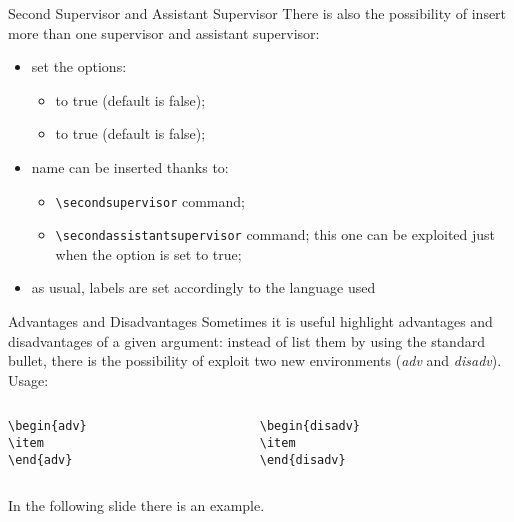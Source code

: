 \begin{frame}[t,fragile]{Second Supervisor and Assistant Supervisor}
There is also the possibility of insert more than one supervisor and assistant supervisor:
\begin{itemize}
\item set the options:
\begin{itemize}
\item {} to true (default is false);
\item {} to true (default is false);
\end{itemize}
\item name can be inserted thanks to:
\begin{itemize}
\item \verb!\secondsupervisor! command;
\item \verb!\secondassistantsupervisor! command; this one can be exploited just when the  option is set to true;
\end{itemize}
\item as usual, labels are set accordingly to the language used
\end{itemize}
\end{frame}

\begin{frame}[t,fragile]{Advantages and Disadvantages}
Sometimes it is useful highlight advantages and disadvantages of a given argument: instead of list them by using the standard bullet, there is the possibility of exploit two new environments (\emph{adv} and \emph{disadv}). Usage:
\begin{columns}
\begin{column}{0.3\paperwidth}
\begin{verbatim}
\begin{adv}
\item 
\end{adv}
\end{verbatim}
\end{column}
\begin{column}{0.3\paperwidth}
\begin{verbatim}
\begin{disadv}
\item 
\end{disadv}
\end{verbatim}
\end{column}
\end{columns}
\bigskip
In the following slide there is an example.
\end{frame}

